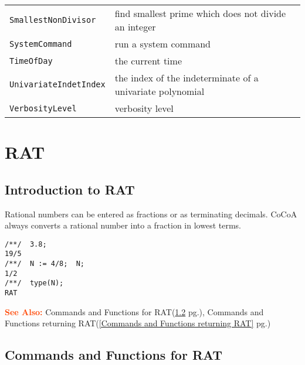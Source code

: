 \documentclass[a4paper]{mybook}
\newcommand\SeeAlso{\par\textcolor{OrangeRed}{\textbf{\large See Also: }}}
\begin{document}
\begin{center}
\begin{longtable}{ll}
{\verb~SmallestNonDivisor~} &
      find smallest prime which does not divide an integer\\
   
{\verb~SystemCommand~} &
      run a system command\\
   
{\verb~TimeOfDay~} &
      the current time\\
   
{\verb~UnivariateIndetIndex~} &
      the index of the indeterminate of a univariate polynomial\\
   
{\verb~VerbosityLevel~} &
      verbosity level\\
   
\end{longtable}
\end{center}

\noindent



\chapter{RAT}
\label{RAT}

      

\section{Introduction to RAT}
\label{Introduction to RAT}

        
Rational numbers can be entered as fractions or as terminating decimals.
CoCoA always converts a rational number into a fraction in lowest terms.
\begin{Verbatim}[label=example, rulecolor=\color{PineGreen}, frame=single]
/**/  3.8;
19/5
/**/  N := 4/8;  N;
1/2
/**/  type(N);
RAT
\end{Verbatim}


\SeeAlso %
  Commands and Functions for RAT(\ref{Commands and Functions for RAT} pg.\pageref{Commands and Functions for RAT}), 
    Commands and Functions returning RAT(\ref{Commands and Functions returning RAT} pg.\pageref{Commands and Functions returning RAT})

\section{Commands and Functions for RAT}
\label{Commands and Functions for RAT}
\end{document}
